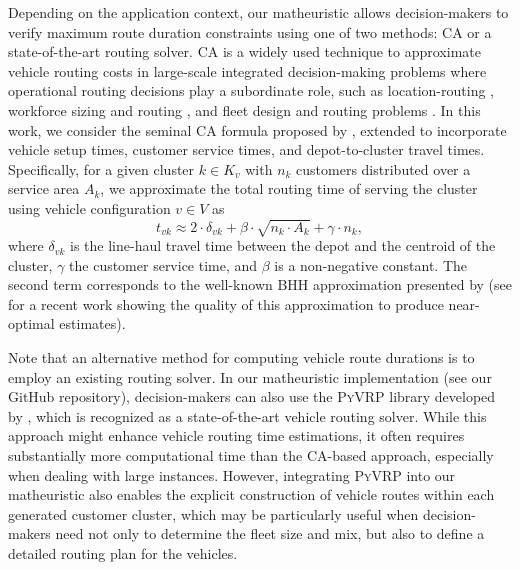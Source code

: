 \documentclass[11pt]{elsarticle}
\theoremstyle{plain}
\newcommand{\blue}[1]{#1}
\begin{document}
Depending on the application context, our matheuristic allows decision-makers to verify maximum route duration constraints using one of two methods: \ac{CA} or a state-of-the-art routing solver. \ac{CA} is a widely used technique to approximate vehicle routing costs in large-scale integrated decision-making problems where operational routing decisions play a subordinate role, such as location-routing \citep{winkenbach2016, Pina2022}, workforce sizing and routing \citep{mandal2025tactical}, and fleet design and routing problems \citep{franceschetti2017strategic, zinnenlauf_2024}. In this work, we consider the seminal \ac{CA} formula proposed by \cite{beardwood1959shortest}, extended to incorporate vehicle setup times, customer service times, and depot-to-cluster travel times. Specifically, for a given cluster $k \in K_v$ with $n_{\blue{k}}$ customers distributed over a service area $A_{\blue{k}}$, we approximate the total routing time of serving the cluster using vehicle configuration $v \in V$ as
\begin{equation}
    t_{vk} \approx 2 \cdot \delta_{vk} + \beta \cdot \sqrt{n_{\blue{k}} \cdot A_{\blue{k}}} + \gamma \cdot n_{\blue{k}},
\end{equation}
where $\delta_{vk}$ is the line-haul travel time between the depot and the centroid of the cluster, $\gamma$ the customer service time, and $\beta$ is a non-negative constant. The second term corresponds to the well-known \ac{BHH} approximation presented by \cite{beardwood1959shortest} (see \cite{silva2022demand} for a recent work showing the quality of this approximation to produce near-optimal estimates). 

Note that an alternative method for computing vehicle route durations is to employ an existing routing solver. In our matheuristic implementation (see our GitHub repository), decision-makers can also use the \textsc{PyVRP} library developed by \cite{wouda_pyvrp_2024}, which is recognized as a state-of-the-art vehicle routing solver. While this approach might enhance vehicle routing time estimations, it often requires substantially more computational time than the \ac{CA}-based approach, especially when dealing with large instances. 
\blue{However, integrating \textsc{PyVRP} into our matheuristic also enables the explicit construction of vehicle routes within each generated customer cluster, which may be particularly useful when decision-makers need not only to determine the fleet size and mix, but also to define a detailed routing plan for the vehicles.}
\end{document}
